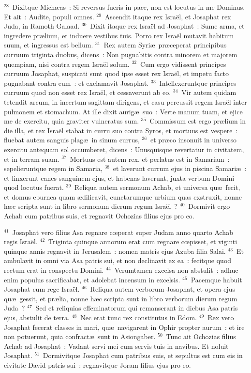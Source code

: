 ${}^{28}$~Dixitque Mich\ae as~: Si reversus fueris in pace, non est locutus in me Dominus. Et ait~: Audite, populi omnes.
${}^{29}$~Ascendit itaque rex Isra\"el, et Josaphat rex Juda, in Ramoth Galaad.
${}^{30}$~Dixit itaque rex Isra\"el ad Josaphat~: Sume arma, et ingredere pr\ae lium, et induere vestibus tuis. Porro rex Isra\"el mutavit habitum suum, et ingressus est bellum.
${}^{31}$~Rex autem Syri\ae\ pr\ae ceperat principibus curruum triginta duobus, dicens~: Non pugnabitis contra minorem et majorem quempiam, nisi contra regem Isra\"el solum.
${}^{32}$~Cum ergo vidissent principes curruum Josaphat, suspicati sunt quod ipse esset rex Isra\"el, et impetu facto pugnabant contra eum~: et exclamavit Josaphat.
${}^{33}$~Intellexeruntque principes curruum quod non esset rex Isra\"el, et cessaverunt ab eo.
${}^{34}$~Vir autem quidam tetendit arcum, in incertum sagittam dirigens, et casu percussit regem Isra\"el inter pulmonem et stomachum. At ille dixit aurig\ae\ suo~: Verte manum tuam, et ejice me de exercitu, quia graviter vulneratus sum.
${}^{35}$~Commissum est ergo pr\ae lium in die illa, et rex Isra\"el stabat in curru suo contra Syros, et mortuus est vespere~: fluebat autem sanguis plag\ae\ in sinum currus,
${}^{36}$~et pr\ae co insonuit in universo exercitu antequam sol occumberet, dicens~: Unusquisque revertatur in civitatem, et in terram suam.
${}^{37}$~Mortuus est autem rex, et perlatus est in Samariam~: sepelieruntque regem in Samaria,
${}^{38}$~et laverunt currum ejus in piscina Samari\ae~: et linxerunt canes sanguinem ejus, et habenas laverunt, juxta verbum Domini quod locutus fuerat.
${}^{39}$~Reliqua autem sermonum Achab, et universa qu\ae\ fecit, et domus eburnea quam \ae dificavit, cunctarumque urbium quas exstruxit, nonne h\ae c scripta sunt in libro sermonum dierum regum Isra\"el~?
${}^{40}$~Dormivit ergo Achab cum patribus suis, et regnavit Ochozias filius ejus pro eo.


${}^{41}$~Josaphat vero filius Asa regnare cœperat super Judam anno quarto Achab regis Isra\"el.
${}^{42}$~Triginta quinque annorum erat cum regnare cœpisset, et viginti quinque annis regnavit in Jerusalem~: nomen matris ejus Azuba filia Salai.
${}^{43}$~Et ambulavit in omni via Asa patris sui, et non declinavit ex ea~: fecitque quod rectum erat in conspectu Domini.
${}^{44}$~Verumtamen excelsa non abstulit~: adhuc enim populus sacrificabat, et adolebat incensum in excelsis.
${}^{45}$~Pacemque habuit Josaphat cum rege Isra\"el.
${}^{46}$~Reliqua autem verborum Josaphat, et opera ejus qu\ae\ gessit, et pr\ae lia, nonne h\ae c scripta sunt in libro verborum dierum regum Juda~?
${}^{47}$~Sed et reliquias effeminatorum qui remanserant in diebus Asa patris ejus, abstulit de terra.
${}^{48}$~Nec erat tunc rex constitutus in Edom.
${}^{49}$~Rex vero Josaphat fecerat classes in mari, qu\ae\ navigarent in Ophir propter aurum~: et ire non potuerunt, quia confract\ae\ sunt in Asiongaber.
${}^{50}$~Tunc ait Ochozias filius Achab ad Josaphat~: Vadant servi mei cum servis tuis in navibus. Et noluit Josaphat.
${}^{51}$~Dormivitque Josaphat cum patribus suis, et sepultus est cum eis in civitate David patris sui~: regnavitque Joram filius ejus pro eo.


